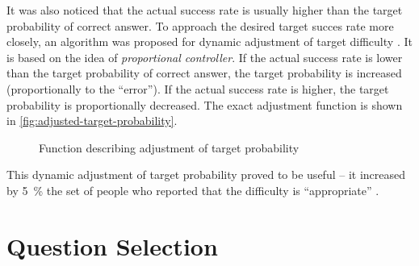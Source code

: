 \documentclass[a4paper, 12pt, twoside]{fithesis2}		%
\renewcommand{\_}{\leavevmode \kern0.07em\vbox{\hrule width0.4em}}
\begin{document}
It was also noticed that the actual success rate is usually higher than the target probability of correct answer.
To approach the desired target succes rate more closely, an algorithm was proposed for dynamic adjustment of target difficulty \cite{slepe-mapy-motivation}.
It is based on the idea of \textit{proportional controller}.
If the actual success rate is lower than the target probability of correct answer, the target probability is increased (proportionally to the ``error'').
If the actual success rate is higher, the target probability is proportionally decreased.
The exact adjustment function is shown in \autoref{fig:adjusted-target-probability}.

\begin{figure}[h]
  \centering
  \caption{Function describing adjustment of target probability}
  \label{fig:adjusted-target-probability}
\end{figure}

This dynamic adjustment of target probability proved to be useful -- it increased by 5~\% the set of people who reported that the difficulty is ``appropriate'' \cite{slepe-mapy-motivation}.


\section{Question Selection}
\label{sec:question-selection}
\end{document}
